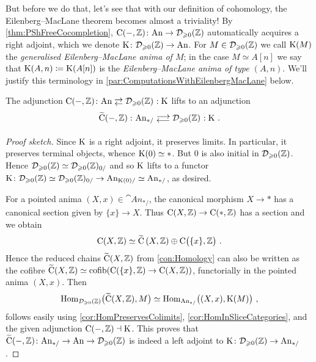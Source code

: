 \begin{con}
	But before we do that, let's see that with our definition of cohomology, the Eilenberg--MacLane theorem becomes almost a triviality! By \cref{thm:PShFreeCocompletion}, $\operatorname{C}(-,\mathbb{Z})\colon \mathrm{An}\rightarrow \mathcal{D}_{\geqslant 0}(\mathbb{Z})$ automatically acquires a right adjoint, which we denote $\operatorname{K}\colon \mathcal{D}_{\geqslant 0}(\mathbb{Z})\rightarrow\mathrm{An}$. For $M\in\mathcal{D}_{\geqslant 0}(\mathbb{Z})$ we call $\operatorname{K}(M)$ the \emph{generalised Eilenberg--MacLane anima of $M$}; in the case $M\simeq A[n]$ we say that $\operatorname{K}(A,n)\coloneqq \operatorname{K}(A[n])$ is the \emph{Eilenberg--MacLane anima of type $(A,n)$}. We'll justify this terminology in \cref{par:ComputationsWithEilenbergMacLane} below.
\end{con}
\begin{lem}\label{lem:KAdjunctionPointedAnima}
	The adjunction $\C(-,\IZ)\colon \cat{An}\shortdoublelrmorphism \Dd_{\geqslant 0}(\IZ)\noloc\K$ lifts to an adjunction
	\begin{equation*}
		\widetilde{\C}\!\left(-,\IZ\right)\colon \cat{An}_{*/}\doublelrmorphism \Dd_{\geqslant 0}(\IZ)\noloc \K\,.
	\end{equation*}
\end{lem}
\begin{proof}[Proof sketch]
	Since $\operatorname{K}$ is a right adjoint, it preserves limits. In particular, it preserves terminal objects, whence $\operatorname{K}(0)\simeq *$. But $0$ is also initial in $\mathcal{D}_{\geqslant 0}(\mathbb{Z})$. Hence $\mathcal{D}_{\geqslant 0}(\mathbb{Z})\simeq \mathcal{D}_{\geqslant 0}(\mathbb{Z})_{0/}$ and so $\operatorname{K}$ lifts to a functor $\operatorname{K}\colon \mathcal{D}_{\geqslant 0}(\mathbb{Z})\simeq \mathcal{D}_{\geqslant 0}(\mathbb{Z})_{0/}\rightarrow \mathrm{An}_{\operatorname{K}(0)/}\simeq \mathrm{An}_{*/}$, as desired.
	
	For a pointed anima $(X,x)\in \cat{An}_{*/}$, the canonical morphism $X\rightarrow*$ has a canonical section given by $\{x\}\rightarrow X$. Thus $\operatorname{C}(X,\mathbb{Z})\rightarrow\operatorname{C}(*,\mathbb{Z})$ has a section and we obtain
	\begin{equation*}
		\C\!\left(X,\IZ\right)\simeq \widetilde{\C}\left(X,\IZ\right)\oplus \C\lef(\{x\},\IZ\righ)\,.
	\end{equation*}
	Hence the reduced chains $\widetilde{\operatorname{C}}(X,\mathbb{Z})$ from \cref{con:Homology} can also be written as the cofibre $\widetilde{\operatorname{C}}(X,\mathbb{Z})\simeq\operatorname{cofib}(\operatorname{C}(\{x\},\mathbb{Z})\rightarrow \operatorname{C}(X,\mathbb{Z}))$, functorially in the pointed anima $(X,x)$. Then
	\begin{equation*}
		\Hom_{\Dd_{\geqslant 0}(\IZ)}\bigl(\widetilde{\C}(X,\IZ),M\bigr)\simeq \Hom_{\cat{An}_{*/}}\lef((X,x),\K(M)\righ)\,,
	\end{equation*}
	follows easily using \cref{cor:HomPreservesColimits}, \cref{cor:HomInSliceCategories}, and the given adjunction $\operatorname{C}(-,\mathbb{Z})\dashv\operatorname{K}$. This proves that $\widetilde{\operatorname{C}}(-,\mathbb{Z})\colon \mathrm{An}_{*/}\rightarrow\mathrm{An}\rightarrow\mathcal{D}_{\geqslant 0}(\mathbb{Z})$ is indeed a left adjoint to $\operatorname{K}\colon \mathcal{D}_{\geqslant 0}(\mathbb{Z})\rightarrow\mathrm{An}_{*/}$.
\end{proof}
